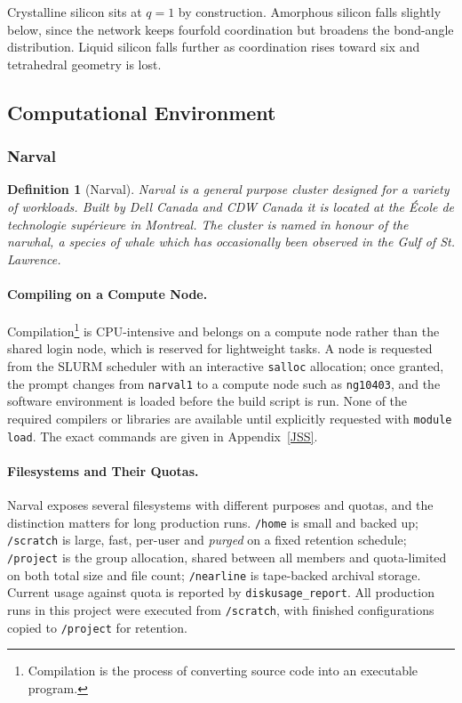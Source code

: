 \documentclass{article}
\newtheorem{definition}{Definition}
\begin{document}
Crystalline silicon sits at $q = 1$ by construction. Amorphous silicon falls slightly below, since the network keeps fourfold coordination but broadens the bond-angle distribution. Liquid silicon falls further as coordination rises toward six and tetrahedral geometry is lost.

\subsection{Computational Environment} %
\subsubsection{Narval}
\begin{definition}[Narval]
    Narval is a general purpose cluster designed for a variety of workloads. Built by Dell Canada and CDW Canada it is located at the École de technologie supérieure in Montreal. The cluster is named in honour of the narwhal, a species of whale which has occasionally been observed in the Gulf of St. Lawrence.
\end{definition}

\paragraph{Compiling on a Compute Node.}
\label{sec:compile}
Compilation\footnote{Compilation is the process of converting source code into an executable program.} is CPU-intensive and belongs on a compute node rather than the shared login node, which is reserved for lightweight tasks. A node is requested from the SLURM scheduler with an interactive \texttt{salloc} allocation; once granted, the prompt changes from \texttt{narval1} to a compute node such as \texttt{ng10403}, and the software environment is loaded before the build script is run. None of the required compilers or libraries are available until explicitly requested with \texttt{module load}. The exact commands are given in Appendix~\ref{JSS}.

\paragraph{Filesystems and Their Quotas.}
\label{sec:filesystems}
Narval exposes several filesystems with different purposes and quotas, and the distinction matters for long production runs. \texttt{/home} is small and backed up; \texttt{/scratch} is large, fast, per-user and \emph{purged} on a fixed retention schedule; \texttt{/project} is the group allocation, shared between all members and quota-limited on both total size and file count; \texttt{/nearline} is tape-backed archival storage. Current usage against quota is reported by \texttt{diskusage\_report}. All production runs in this project were executed from \texttt{/scratch}, with finished configurations copied to \texttt{/project} for retention.
\end{document}
